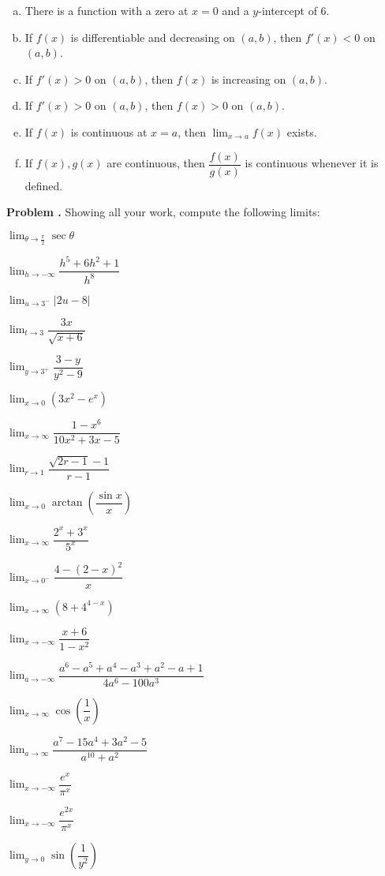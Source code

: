 \documentclass[11pt,letterpaper]{article}
\newenvironment{2enumerate}{%
	\begin{enumerate}[(a)]
	\begin{multicols}{2}
	}{%
	\end{multicols}
	\end{enumerate}
}
\newcommand{\ds}{\displaystyle}
\newcommand{\pspace}{\par\vspace{\baselineskip}}
\newcounter{problem}
\newcommand{\prob}{\stepcounter{problem}%
\noindent\textbf{Problem \theproblem. }}
\begin{document}
\begin{enumerate}[(a)]
        \item There is a function with a zero at $x=0$ and a $y$-intercept of 6. 
        \item If $f(x)$ is differentiable and decreasing on $(a, b)$, then $f'(x) < 0$ on $(a, b)$.  
        \item If $f'(x) > 0$ on $(a,b)$, then $f(x)$ is increasing on $(a, b)$.
        \item If $f'(x) > 0$ on $(a,b)$, then $f(x) > 0$ on $(a, b)$.
        \item If $f(x)$ is continuous at $x= a$, then $\ds\lim_{x \to a} f(x)$ exists. 
        \item If $f(x), g(x)$ are continuous, then $\dfrac{f(x)}{g(x)}$ is continuous whenever it is defined. 
        \end{enumerate}



\newpage



\prob Showing all your work, compute the following limits:
	\begin{2enumerate}
	\item $\ds\lim_{\theta \to \frac{\pi}{2}} \sec \theta$
	\item $\ds\lim_{h \to -\infty} \dfrac{h^5 + 6h^2 + 1}{h^8}$
	\item $\ds\lim_{u \to 3^-} |2u - 8|$
	\item $\ds\lim_{t \to 3} \dfrac{3x}{\sqrt{x + 6}}$
	\item $\ds\lim_{y \to 3^+} \dfrac{3 - y}{y^2 - 9}$
	\item $\ds\lim_{x \to 0} \left(3x^2 - e^x \right)$
	\item $\ds\lim_{x \to \infty} \dfrac{1 - x^6}{10x^2 + 3x - 5}$
	\item $\ds\lim_{r \to 1} \dfrac{\sqrt{2r - 1} - 1}{r - 1}$
	\item $\ds\lim_{x \to 0} \arctan \left( \dfrac{\sin x}{x} \right)$
	\item $\ds\lim_{x \to \infty} \dfrac{2^x + 3^x}{5^x}$
	\item $\ds\lim_{x \to 0^-} \dfrac{4 - (2 - x)^2}{x}$
	\item $\ds\lim_{x \to \infty} \left( 8 + 4^{4 - x} \right)$
	\item $\ds\lim_{x \to -\infty} \dfrac{x + 6}{1 - x^2}$
	\item $\ds\lim_{a \to -\infty} \dfrac{a^6 - a^5 + a^4 - a^3 + a^2 - a + 1}{4a^6 - 100a^3}$
	\item $\ds\lim_{x \to \infty} \cos \left( \dfrac{1}{x} \right)$
	\item $\ds\lim_{a \to \infty} \dfrac{a^7 - 15a^4 + 3a^2 - 5}{a^{10} + a^2}$
	\item $\ds\lim_{x \to -\infty} \dfrac{e^x}{\pi^x}$
	\item $\ds\lim_{x \to -\infty} \dfrac{e^{2x}}{\pi^x}$
	\item $\ds\lim_{y \to 0} \sin \left( \dfrac{1}{y^2} \right)$
	\end{2enumerate} \pspace
\end{document}
